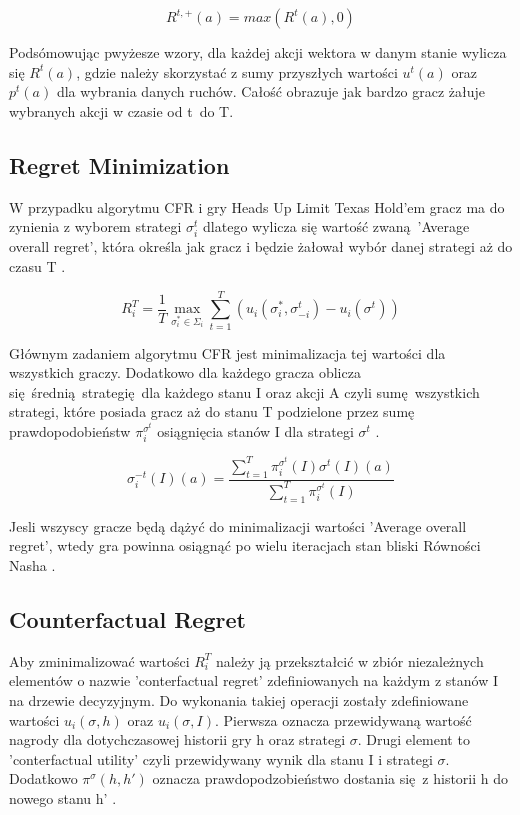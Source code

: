 \documentclass[12pt,oneside,a4paper]{report}
\begin{document}
\begin{equation}
   R^{t,\text{+}}(a) = max(R^t(a),0)
\end{equation}

Podsómowując pwyżesze wzory, dla każdej akcji wektora w danym stanie wylicza się $R^{t}(a)$, gdzie
należy skorzystać z sumy przyszłych wartości $u^{t}(a)$ oraz $p^{t}(a)$ 
dla wybrania danych ruchów. Całość obrazuje jak bardzo gracz żałuje wybranych
akcji w czasie od t do T.

\subsection{Regret Minimization}

W przypadku algorytmu CFR i gry Heads Up Limit Texas Hold'em gracz ma do zynienia z wyborem strategi
$\sigma_{i}^{t}$ dlatego wylicza się wartość zwaną 'Average overall regret', która określa jak gracz
i będzie żałował wybór danej strategi aż do czasu T \cite{rmg}.

\begin{equation}
   R^{T}_{i} = \frac{1}{T} \max_{\sigma^{*}_{i} \in \Sigma_{i}} \sum_{t=1}^{T}
   \left(u_{i}\left(\sigma_{i}^{*}, \sigma_{-i}^{t}\right) - u_{i}(\sigma^{t})\right)
\end{equation}

Głównym zadaniem algorytmu CFR jest minimalizacja tej wartości dla wszystkich graczy.
Dodatkowo dla każdego gracza oblicza się średnią strategię dla 
każdego stanu I oraz akcji A czyli sumę wszystkich strategi, które posiada gracz aż do stanu T
podzielone przez sumę prawdopodobieństw $\pi^{\sigma^{t}}_{i}$ osiągnięcia stanów I dla
strategi $\sigma^{t}$ \cite{rmg}.

\begin{equation}
   \sigma^{-t}_{i} \left(I\right) \left(a\right) = \frac{\sum^{T}_{t=1} \pi^{\sigma^{t}}_{i}
   (I)\sigma^{t}(I)(a)}{\sum^{T}_{t=1} \pi^{\sigma^{t}}_{i}(I)}
\end{equation}

Jesli wszyscy gracze będą dążyć do minimalizacji wartości 'Average overall regret', wtedy gra
powinna osiągnąć po wielu iteracjach stan bliski Równości Nasha \cite{rmg}.



\subsection{Counterfactual Regret}

Aby zminimalizować wartości $R^{T}_{i}$ należy ją przekształcić w zbiór niezależnych elementów o
nazwie 'conterfactual regret' zdefiniowanych na każdym z stanów I na drzewie decyzyjnym.
Do wykonania takiej operacji zostały zdefiniowane wartości $u_{i}(\sigma, h)$ oraz $u_{i}(\sigma,
I)$. Pierwsza oznacza przewidywaną wartość nagrody dla dotychczasowej historii gry h oraz strategi
$\sigma$. Drugi element to 'conterfactual utility' czyli przewidywany wynik dla stanu I i strategi
$\sigma$. Dodatkowo $\pi^{\sigma} (h, h')$ oznacza prawdopodzobieństwo dostania się z historii h do 
nowego stanu h' \cite{rmg}.
\end{document}
